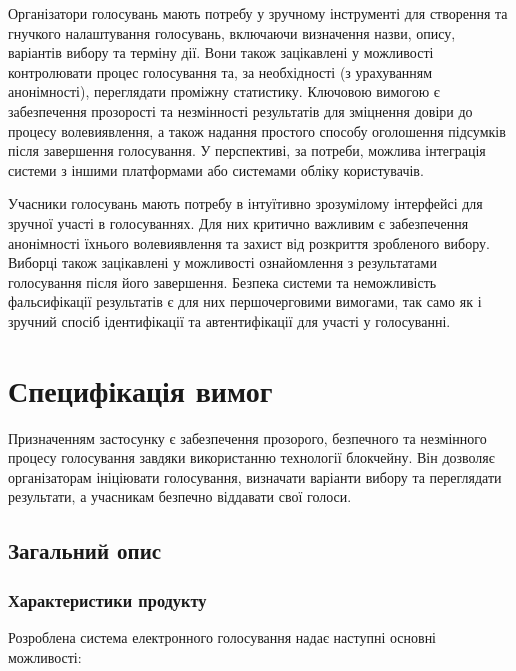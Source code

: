 \documentclass[14pt]{extreport}
\begin{document}
  Організатори голосувань мають потребу у зручному інструменті для створення та гнучкого налаштування голосувань, включаючи визначення назви, опису, варіантів вибору та терміну дії. Вони також зацікавлені у можливості контролювати процес голосування та, за необхідності (з урахуванням анонімності), переглядати проміжну статистику. Ключовою вимогою є забезпечення прозорості та незмінності результатів для зміцнення довіри до процесу волевиявлення, а також надання простого способу оголошення підсумків після завершення голосування. У перспективі, за потреби, можлива інтеграція системи з іншими платформами або системами обліку користувачів.
  
  Учасники голосувань мають потребу в інтуїтивно зрозумілому інтерфейсі для зручної участі в голосуваннях. Для них критично важливим є забезпечення анонімності їхнього волевиявлення та захист від розкриття зробленого вибору. Виборці також зацікавлені у можливості ознайомлення з результатами голосування після його завершення. Безпека системи та неможливість фальсифікації результатів є для них першочерговими вимогами, так само як і зручний спосіб ідентифікації та автентифікації для участі у голосуванні.
  
  \section{Специфікація вимог}
  
  Призначенням застосунку є забезпечення прозорого, безпечного та незмінного процесу голосування завдяки використанню технології блокчейну. Він дозволяє організаторам ініціювати голосування, визначати варіанти вибору та переглядати результати, а учасникам безпечно віддавати свої голоси.
  
  
  \subsection{Загальний опис}
  \subsubsection{Характеристики продукту} 
  
  Розроблена система електронного голосування надає наступні основні можливості:
  
\end{document}

